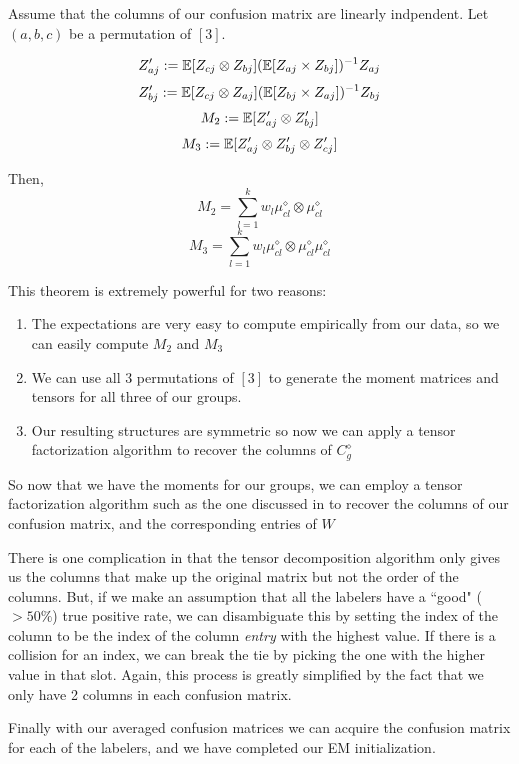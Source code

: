 \begin{theorem}
Assume that the columns of our confusion matrix are linearly indpendent. Let $(a,b,c)$ be a permutation of $[3]$.

$$Z'_{aj} := \mathbb{E}[Z_{cj} \otimes Z_{bj}](\mathbb{E}[Z_{aj} \times Z_{bj}])^{-1}Z_{aj}$$
$$Z'_{bj} := \mathbb{E}[Z_{cj} \otimes Z_{aj}](\mathbb{E}[Z_{bj} \times Z_{aj}])^{-1}Z_{bj}$$
$$M_{2} := \mathbb{E}[Z'_{aj} \otimes  Z'_{bj}]$$
$$M_{3} := \mathbb{E}[Z'_{aj} \otimes Z'_{bj} \otimes Z'_{cj}]$$

Then,
$$M_{2} = \displaystyle\sum\limits_{l=1}^{k} w_{l}\mu^{\diamond}_{cl} \otimes \mu^{\diamond}_{cl} $$
$$M_{3} = \displaystyle\sum\limits_{l=1}^{k} w_{l}\mu^{\diamond}_{cl} \otimes \mu^{\diamond}_{cl} \mu^{\diamond}_{cl} $$
\end{theorem}

This theorem is extremely powerful for two reasons:

\begin{enumerate}
\item The expectations are very easy to compute empirically from our data, so we can easily compute $M_{2}$ and $M_{3}$
\item We can use all 3 permutations of $[3]$ to generate the moment matrices and tensors for all three of our groups.
\item Our resulting structures are symmetric so now we can apply a tensor factorization algorithm to recover the columns of $C^{\diamond}_{g}$
\end{enumerate}

So now that we have the moments for our groups, we can employ a tensor factorization algorithm such as the one discussed in \cite{anandkumar2014tensor} to recover the columns of our confusion matrix, and the corresponding entries of $W$

There is one complication in that the tensor decomposition algorithm only gives us the columns that make up the original matrix but not the order of the columns. But, if we make an assumption that all the labelers have a ``good" ($>50\%$) true positive rate, we can disambiguate this by setting the index of the column to be the index of the column \textit{entry} with the highest value. If there is a collision for an index, we can break the tie by picking the one with the higher value in that slot. Again, this process is greatly simplified by the fact that we only have 2 columns in each confusion matrix.

Finally with our averaged confusion matrices we can acquire the confusion matrix for each of the labelers, and we have completed our EM initialization.

